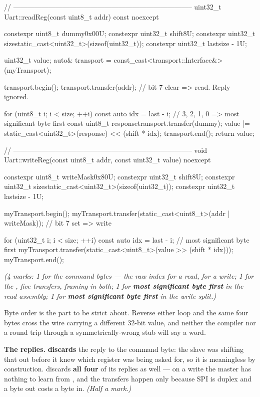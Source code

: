 \begin{cppcode}
// -----------------------------------------------------------------------------
uint32_t Uart::readReg(const uint8_t addr) const noexcept
{
    constexpr uint8_t dummy{0x00U};
    constexpr uint32_t shift{8U};
    constexpr uint32_t size{static_cast<uint32_t>(sizeof(uint32_t))};
    constexpr uint32_t last{size - 1U};

    uint32_t value{};
    auto& transport = const_cast<transport::Interface&>(myTransport);

    transport.begin();
    transport.transfer(addr);              // bit 7 clear => read. Reply ignored.

    for (uint8_t i{}; i < size; ++i)
    {
        const auto idx = last - i;         // 3, 2, 1, 0 => most significant byte first
        const uint8_t response{transport.transfer(dummy)};
        value |= static_cast<uint32_t>(response) << (shift * idx);
    }
    transport.end();
    return value;
}

// -----------------------------------------------------------------------------
void Uart::writeReg(const uint8_t addr, const uint32_t value) noexcept
{
    constexpr uint8_t writeMask{0x80U};
    constexpr uint32_t shift{8U};
    constexpr uint32_t size{static_cast<uint32_t>(sizeof(uint32_t))};
    constexpr uint32_t last{size - 1U};

    myTransport.begin();
    myTransport.transfer(static_cast<uint8_t>(addr | writeMask));   // bit 7 set => write

    for (uint32_t i{}; i < size; ++i)
    {
        const auto idx = last - i;         // most significant byte first
        myTransport.transfer(static_cast<uint8_t>(value >> (shift * idx)));
    }
    myTransport.end();
}
\end{cppcode}

{\itshape (4 marks: 1 for the command bytes --- the raw index for a read,  for a
write; 1 for the , five transfers,  framing in both; 1 for \textbf{most
significant byte first} in the read assembly; 1 for \textbf{most significant byte first} in the
write split.)\par}

\medskip
Byte order is the part to be strict about. Reverse either loop and the same four bytes cross the
wire carrying a different 32-bit value, and neither the compiler nor a round trip through a
symmetrically-wrong stub will say a word.

\textbf{The replies.}  \textbf{discards} the reply to the command byte: the slave was
shifting that out before it knew which register was being asked for, so it is meaningless by
construction.  discards \textbf{all four} of its replies as well --- on a write the
master has nothing to learn from , and the transfers happen only because SPI is duplex and
a byte out costs a byte in. \textit{(Half a mark.)}

